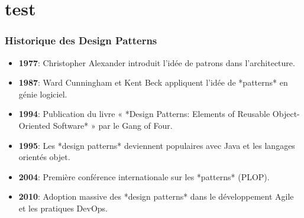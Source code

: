 \documentclass[aspectratio=169]{beamer}
\begin{document}
\begin{frame}
    \titlepage
\end{frame}

\begin{frame}
    \tableofcontents[hideallsubsections]
\end{frame}
\section{test}
\begin{frame}[t]
    \frametitle{Historique des Design Patterns}
    
    
    \begin{itemize}
        \item<1> \textbf{1977}: Christopher Alexander introduit l'idée de patrons dans l'architecture.
        \item<2> \textbf{1987}: Ward Cunningham et Kent Beck appliquent l'idée de *patterns* en génie logiciel.
        \item<3> \textbf{1994}: Publication du livre « *Design Patterns: Elements of Reusable Object-Oriented Software* » par le Gang of Four.
        \item<4> \textbf{1995}: Les *design patterns* deviennent populaires avec Java et les langages orientés objet.
        \item<5> \textbf{2004}: Première conférence internationale sur les *patterns* (PLOP).
        \item<6> \textbf{2010}: Adoption massive des *design patterns* dans le développement Agile et les pratiques DevOps.
    \end{itemize}
    
    \end{frame}
    
\end{document}
